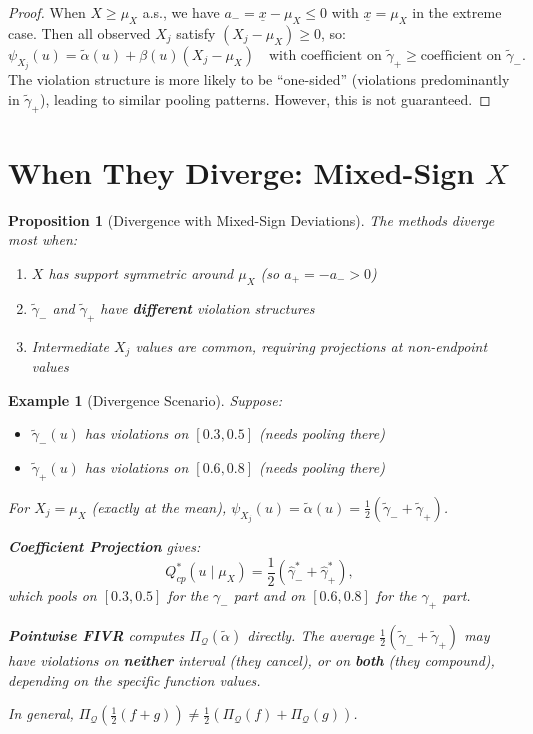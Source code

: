 \documentclass[12pt]{article}
\newcommand{\PiQ}{\Pi_{\mathcal{Q}}}
\newtheorem{proposition}{Proposition}
\newtheorem{example}{Example}
\begin{document}
\begin{proof}
When $X \geq \mu_X$ a.s., we have $a_- = \underline{x} - \mu_X \leq 0$ with $\underline{x} = \mu_X$ in the extreme case. Then all observed $X_j$ satisfy $(X_j - \mu_X) \geq 0$, so:
\[
\psi_{X_j}(u) = \tilde{\alpha}(u) + \beta(u)(X_j - \mu_X) \quad \text{with coefficient on } \tilde{\gamma}_+ \geq \text{coefficient on } \tilde{\gamma}_-.
\]
The violation structure is more likely to be ``one-sided'' (violations predominantly in $\tilde{\gamma}_+$), leading to similar pooling patterns. However, this is not guaranteed.
\end{proof}

\section{When They Diverge: Mixed-Sign $X$}

\begin{proposition}[Divergence with Mixed-Sign Deviations]\label{prop:diverge}
The methods diverge most when:
\begin{enumerate}
\item $X$ has support symmetric around $\mu_X$ (so $a_+ = -a_- > 0$)
\item $\tilde{\gamma}_-$ and $\tilde{\gamma}_+$ have \textbf{different} violation structures
\item Intermediate $X_j$ values are common, requiring projections at non-endpoint values
\end{enumerate}
\end{proposition}

\begin{example}[Divergence Scenario]
Suppose:
\begin{itemize}
\item $\tilde{\gamma}_-(u)$ has violations on $[0.3, 0.5]$ (needs pooling there)
\item $\tilde{\gamma}_+(u)$ has violations on $[0.6, 0.8]$ (needs pooling there)
\end{itemize}

For $X_j = \mu_X$ (exactly at the mean), $\psi_{X_j}(u) = \tilde{\alpha}(u) = \frac{1}{2}(\tilde{\gamma}_- + \tilde{\gamma}_+)$.

\textbf{Coefficient Projection} gives:
\[
Q^*_{cp}(u \mid \mu_X) = \frac{1}{2}(\hat{\gamma}_-^* + \hat{\gamma}_+^*),
\]
which pools on $[0.3, 0.5]$ for the $\gamma_-$ part and on $[0.6, 0.8]$ for the $\gamma_+$ part.

\textbf{Pointwise FIVR} computes $\PiQ(\tilde{\alpha})$ directly. The average $\frac{1}{2}(\tilde{\gamma}_- + \tilde{\gamma}_+)$ may have violations on \textbf{neither} interval (they cancel), or on \textbf{both} (they compound), depending on the specific function values.

In general, $\PiQ(\frac{1}{2}(f + g)) \neq \frac{1}{2}(\PiQ(f) + \PiQ(g))$.
\end{example}
\end{document}
